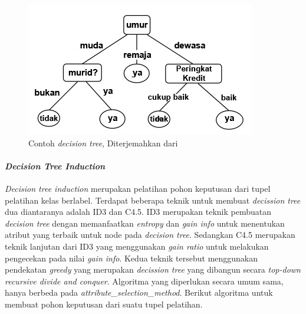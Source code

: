 \begin{figure}
\centering
\includegraphics[scale=1]{Gambar/decisiontree.jpg}
\caption[Contoh \textsl{decision tree}]{Contoh \textsl{decision tree}, Diterjemahkan dari \cite{DM}} 
\label{fig:decisionTree}
\end{figure}

\paragraph{\textsl{Decision Tree Induction}}

\textsl{Decision tree induction} merupakan pelatihan pohon keputusan dari tupel pelatihan kelas berlabel. Terdapat beberapa teknik untuk membuat \textsl{decission tree} dua diantaranya adalah ID3 dan C4.5. ID3 merupakan teknik pembuatan \textsl{decision tree} dengan memanfaatkan \textsl{entropy} dan \textsl{gain info} untuk menentukan atribut yang terbaik untuk node pada \textsl{decision tree}. Sedangkan C4.5 merupakan teknik lanjutan dari ID3 yang menggunakan \textsl{gain ratio} untuk melakukan pengecekan pada nilai \textsl{gain info}. Kedua teknik tersebut menggunakan pendekatan \textsl{greedy} yang merupakan \textsl{decission tree} yang dibangun secara \textsl{top-down recursive divide and conquer}. Algoritma yang diperlukan secara umum sama, hanya berbeda pada \textsl{attribute\_selection\_method}. Berikut algoritma untuk membuat pohon keputusan dari suatu tupel pelatihan.


